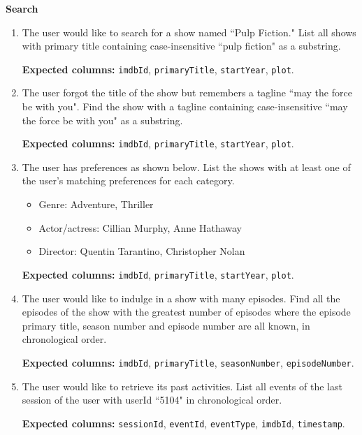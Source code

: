 \documentclass[10pt,titlepage]{article}
\begin{document}
\textbf{Search}
\begin{enumerate}[resume]
    \item The user would like to search for a show named ``Pulp Fiction." List all shows with primary title containing
        case-insensitive ``pulp fiction" as a substring.

        \textbf{Expected columns:} \texttt{imdbId}, \texttt{primaryTitle}, \texttt{startYear}, \texttt{plot}.

    \item The user forgot the title of the show but remembers a tagline ``may the force be with you". Find the show with
        a tagline containing case-insensitive ``may the force be with you" as a substring.

        \textbf{Expected columns:} \texttt{imdbId}, \texttt{primaryTitle}, \texttt{startYear}, \texttt{plot}.

    \item The user has preferences as shown below. List the shows with at least one of the user’s matching preferences
        for each category.
        \begin{itemize}
            \item Genre: Adventure, Thriller 
            \item Actor/actress: Cillian Murphy, Anne Hathaway 
            \item Director: Quentin Tarantino, Christopher Nolan 
        \end{itemize}

        \textbf{Expected columns:} \texttt{imdbId}, \texttt{primaryTitle}, \texttt{startYear}, \texttt{plot}.

    \item The user would like to indulge in a show with many episodes. Find all the episodes of the show with the
        greatest number of episodes where the episode primary title, season number and episode number are all known, in
        chronological order.

        \textbf{Expected columns:} \texttt{imdbId}, \texttt{primaryTitle}, \texttt{seasonNumber},
        \texttt{episodeNumber}.

    \item The user would like to retrieve its past activities. List all events of the last session of the user with
        userId ``5104" in chronological order.

        \textbf{Expected columns:} \texttt{sessionId}, \texttt{eventId}, \texttt{eventType}, \texttt{imdbId},
        \texttt{timestamp}.
\end{enumerate}
\end{document}
